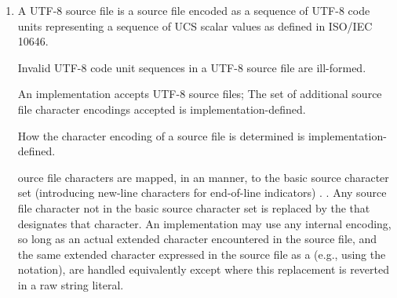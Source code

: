 \documentclass{wg21}
\begin{document}
\begin{enumerate}
    \item

\begin{addedblock}
    A UTF-8 source file is a source file encoded as a sequence of UTF-8 code units representing a sequence of UCS scalar values as defined in ISO/IEC 10646.

    \begin{note}
        Invalid UTF-8 code unit sequences in a UTF-8 source file are ill-formed.
    \end{note}
    An implementation accepts UTF-8 source files; The set of additional source file character encodings accepted is implementation-defined.

    How the character encoding of a source file is determined is implementation-defined.
\end{addedblock}

ource file characters are mapped, in an
 manner,
to the basic source character set (introducing new-line characters for end-of-line
indicators) .
.
Any source file character not in the basic source character set is replaced by the  that
designates that character.
An implementation may use any internal
encoding, so long as an actual extended character encountered in the
source file, and the same extended character expressed in the source
file as a  (e.g., using the  notation), are handled equivalently except where this replacement is reverted in a raw string literal.


\end{enumerate}
\end{document}
